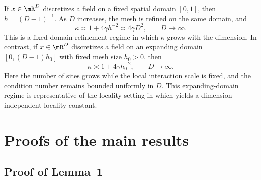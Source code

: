 \documentclass[11pt]{article}
\begin{document}
If $x\in\mR^D$ discretizes a field on a fixed spatial domain $[0,1]$, then $h=(D-1)^{-1}$.
As $D$ increases, the mesh is refined on the same domain, and
\begin{equation}
    \kappa \asymp 1 + 4\gamma h^{-2} \asymp 4\gamma D^2,
    \qquad D\to\infty.
\end{equation}
This is a fixed-domain refinement regime in which $\kappa$ grows with the dimension.
In contrast, if $x\in\mR^D$ discretizes a field on an expanding domain $[0,(D-1)h_0]$ with fixed mesh size $h_0>0$, then
\begin{equation}
    \kappa \asymp 1 + 4\gamma h_0^{-2},
    \qquad D\to\infty.
\end{equation}
Here the number of sites grows while the local interaction scale is fixed, and the condition number remains bounded uniformly in $D$.
This expanding-domain regime is representative of the locality setting in which  yields a dimension-independent locality constant.

\section{Proofs of the main results}
\label{app:main_results}

\subsection{Proof of Lemma~1}
\label{app:lem_ExpSolu}
\end{document}
